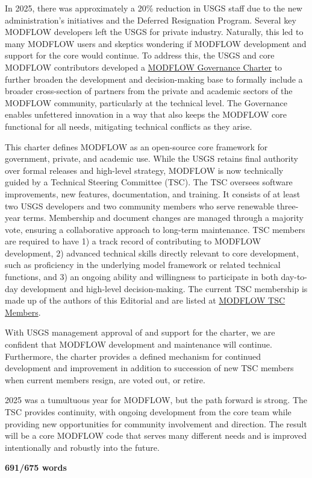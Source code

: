 \documentclass[11pt, oneside]{article}   	%
\begin{document}
In 2025, there was approximately a 20\% reduction in USGS staff due to the new administration's initiatives and the Deferred Resignation Program. Several key MODFLOW developers left the USGS for private industry. Naturally, this led to many MODFLOW users and skeptics wondering if MODFLOW development and support for the core would continue. To address this, the USGS and core MODFLOW contributors developed a \href{https://github.com/MODFLOW-ORG/modflow6/wiki/MODFLOW-Governance-Charter}{MODFLOW Governance Charter} to further broaden the development and decision-making base to formally include a broader cross-section of partners from the private and academic sectors of the MODFLOW community, particularly at the technical level. The Governance enables unfettered innovation in a way that also keeps the MODFLOW core functional for all needs, mitigating technical conflicts as they arise.

This charter defines MODFLOW as an open-source core framework for government, private, and academic use. While the USGS retains final authority over formal releases and high-level strategy, MODFLOW is now technically guided by a Technical Steering Committee (TSC).
The TSC oversees software improvements, new features, documentation, and training. It consists of at least two USGS developers and two community members who serve renewable three-year terms. Membership and document changes are managed through a majority vote, ensuring a collaborative approach to long-term maintenance. TSC members are required to have 1) a track record of contributing to MODFLOW development, 2) advanced technical skills directly relevant to core development, such as proficiency in the underlying model framework or related technical functions, and 3) an ongoing ability and willingness to participate in both day-to-day development and high-level decision-making. The current TSC membership is made up of the authors of this Editorial and are listed at \href{https://github.com/MODFLOW-ORG/modflow6/wiki/Technical-Steering-Committee-Meetings}{MODFLOW TSC Members}.

With USGS management approval of and support for the charter, we are confident that MODFLOW development and maintenance will continue. Furthermore, the charter provides a defined mechanism for continued development and improvement in addition to succession of new TSC members when current members resign, are voted out, or retire. 

2025 was a tumultuous year for MODFLOW, but the path forward is strong. The TSC provides continuity, with ongoing development from the core team while providing new opportunities for community involvement and direction. The result will be a core MODFLOW code that serves many different needs and is improved intentionally and robustly into the future.

\noindent\textbf{691/675 words}



\end{document}
